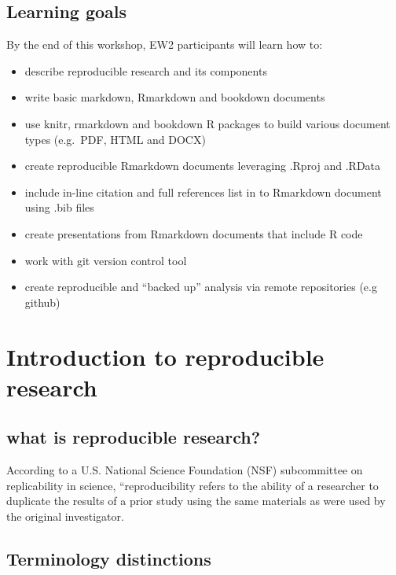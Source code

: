 \documentclass[]{book}
\providecommand{\tightlist}{%
  \setlength{\itemsep}{0pt}\setlength{\parskip}{0pt}}
\begin{document}
\hypertarget{learning-goals}{%
\section{Learning goals}\label{learning-goals}}

By the end of this workshop, EW2 participants will learn how to:

\begin{itemize}
\tightlist
\item
  describe reproducible research and its components
\item
  write basic markdown, Rmarkdown and bookdown documents
\item
  use knitr, rmarkdown and bookdown R packages to build various document types (e.g.~PDF, HTML and DOCX)
\item
  create reproducible Rmarkdown documents leveraging .Rproj and .RData
\item
  include in-line citation and full references list in to Rmarkdown document using .bib files
\item
  create presentations from Rmarkdown documents that include R code
\item
  work with git version control tool
\item
  create reproducible and ``backed up'' analysis via remote repositories (e.g github)
\end{itemize}

\hypertarget{introduction-to-reproducible-research}{%
\chapter{Introduction to reproducible research}\label{introduction-to-reproducible-research}}

\hypertarget{what-is-reproducible-research}{%
\section{what is reproducible research?}\label{what-is-reproducible-research}}

According to a U.S. National Science Foundation (NSF) subcommittee on replicability in science, ``reproducibility refers to the ability of a researcher to duplicate the results of a prior study using the same materials as were used by the original investigator.

\hypertarget{terminology-distinctions}{%
\section{Terminology distinctions}\label{terminology-distinctions}}
\end{document}
